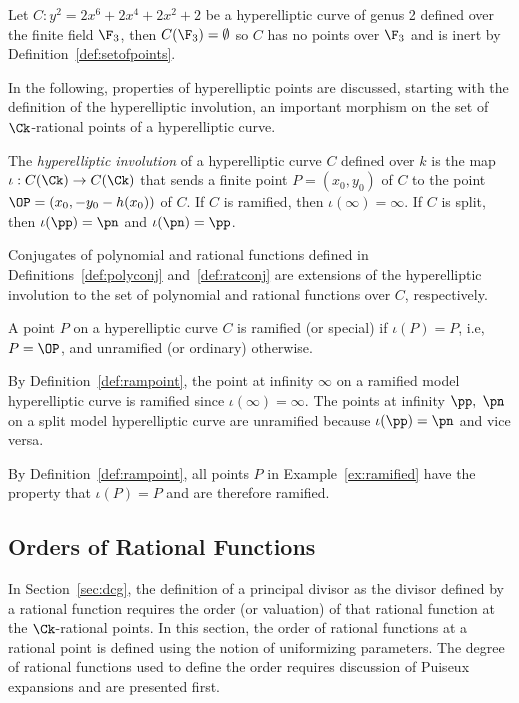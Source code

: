 \be\label{ex:inertsplit} Let $C : y^2 = 2x^6 + 2x^4 + 2x^2 + 2$ be a
hyperelliptic curve of genus 2 defined over the finite field $\F_{3}$, then
$C(\F_{3}) = \emptyset$ so $C$ has no points over $\F_{3}$ and is inert by
Definition~\ref{def:setofpoints}.
\ee 
 

In the following, properties of hyperelliptic points are discussed, starting
with the definition of the hyperelliptic involution, an important morphism on
the set of $\Ck$-rational points of a hyperelliptic curve.

\bd \label{def:involution}
\cite[Adapted from Definition~12.4.9]{HandbookFF_2013}  The \emph{hyperelliptic
involution} of a hyperelliptic curve $C$ defined over $k$ is the map $\iota :
C(\Ck) \rightarrow  C(\Ck)$ that sends a finite point $P = (x_0,y_0)$ of $C$ to
the point $\OP = (x_0, -y_0 - h(x_0))$ of $C$. If $C$ is ramified, then
$\iota(\infty) = \infty$. If $C$ is split, then $\iota(\pp) = \pn$ and
$\iota(\pn) = \pp$.
\ed

\br
Conjugates of polynomial and rational functions defined in
Definitions~\ref{def:polyconj} and~\ref{def:ratconj} are extensions of the
hyperelliptic involution to the set of polynomial and rational functions over
$C$, respectively.
\er

\bd \label{def:rampoint}
\cite[Adapted from Remark~12.4.10]{HandbookFF_2013}  A point $P$ on a
hyperelliptic curve $C$ is ramified (or special) if $\iota(P) = P$, i.e, $P =
\OP$, and unramified (or ordinary) otherwise. 
\ed

\be
By Definition~\ref{def:rampoint}, the point at infinity $\infty$ on a ramified
model hyperelliptic curve is ramified since $\iota(\infty) = \infty$. The points
at infinity $\pp,$ $\pn$ on a split model hyperelliptic curve are unramified
because $\iota(\pp) = \pn$ and vice versa.
\ee

\be
By Definition~\ref{def:rampoint}, all points $P$ in Example~\ref{ex:ramified}
have the property that $\iota(P) = P$ and are therefore ramified. 
\ee





\subsection{Orders of Rational Functions}\label{sec:orders}
In Section~\ref{sec:dcg}, the definition of a principal divisor as the divisor
defined by a rational function requires the order (or valuation) of that rational function at
the $\Ck$-rational points. In this section, the order of rational functions at a
rational point is defined using the notion of uniformizing parameters. The
degree of rational functions used to define the order requires discussion of
Puiseux expansions and are presented first.

